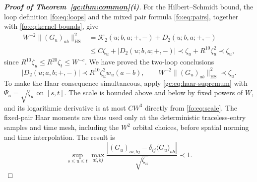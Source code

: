 \documentclass[11pt]{article}
\numberwithin{equation}{section}
\theoremstyle{remark}
\newcommand{\cK}{\mathcal K}
\newcommand{\HS}{\mathrm{HS}}
\begin{document}
\begin{proof}[\textbf{Proof of Theorem~\ref{gc:thm:common}(i)}]
For the Hilbert--Schmidt bound, the loop definition \eqref{fo:eq:loops}
and the mixed pair formula \eqref{fo:eq:pairs}, together with
\eqref{fo:eq:kernel-bounds}, give
\[
 \begin{aligned}
 W^{-2}\|(G_u)_{ab}\|_{\HS}^2
 &=\cK_2(u;b,a;+,-)+D_2(u;b,a;+,-)\\
 &\le C\zeta_u+|D_2(u;b,a;+,-)|
 \prec\zeta_u+R^{10}\zeta_u^2\prec\zeta_u,
 \end{aligned}
\]
since $R^{10}\zeta_u\le R^{20}\zeta_t\le W^{-c}$.
We have proved the two-loop conclusions
\begin{equation}\label{gc:eq:weakpair}
 |D_2(u;a,b;+,-)|\prec R^{10}\zeta_u^2w_u(a-b),\qquad
 W^{-2}\|(G_u)_{ab}\|_{\HS}^2\prec\zeta_u.
\end{equation}
To make the Haar consequence simultaneous, apply
\eqref{gc:eq:haar-supremum} with $\Psi_u=\sqrt{\zeta_u}$ on $[s,t]$.
The scale is bounded above and below by fixed powers of $W$, and its
logarithmic derivative is at most $CW^3$ directly from
\eqref{fo:eq:scale}. The fixed-pair Haar moments are thus
used only at the deterministic traceless-entry samples and time mesh,
including the $W^2$ orbital choices, before spatial norming and time
interpolation. The result is
\begin{equation}\label{fo:eq:sharp-traceless}
 \sup_{s\le u\le t}\max_{ai,bj}
 \frac{|(G_u)_{ai,bj}-\delta_{ij}\langle G_u\rangle_{ab}|}
      {\sqrt{\zeta_u}}\prec1.
\end{equation}


\end{proof}
\end{document}
